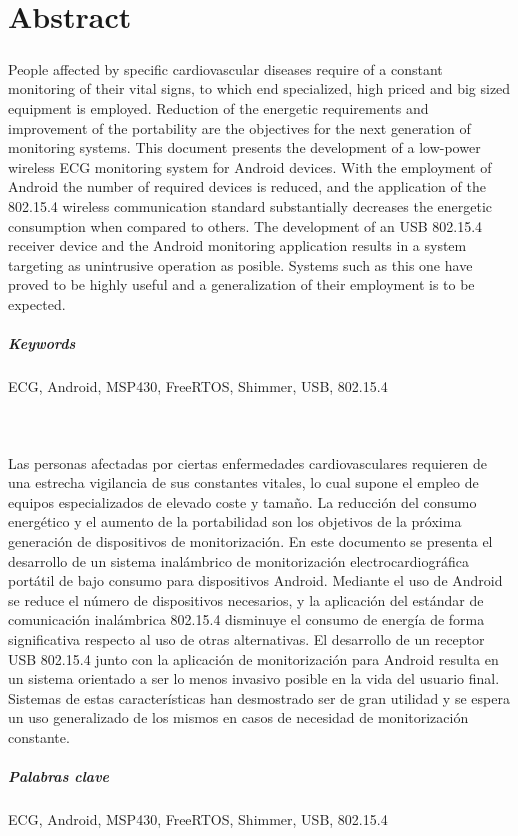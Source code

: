 \chapter{Abstract}
\label{cha:abstract}

	{\small 
	\paragraph{} People affected by specific cardiovascular diseases require of a constant monitoring of their vital signs, to which end specialized, high priced and big sized equipment is employed. Reduction of the energetic requirements and improvement of the portability are the objectives for the next generation of monitoring systems. This document presents the development of a low-power wireless ECG monitoring system for Android devices. With the employment of Android the number of required devices is reduced, and the application of the 802.15.4 wireless communication standard substantially decreases the energetic consumption when compared to others. The development of an USB 802.15.4 receiver device and the Android monitoring application results in a system targeting as unintrusive operation as posible. Systems such as this one have proved to be highly useful and a generalization of their employment is to be expected.
	\paragraph{Keywords}	
	ECG, Android, MSP430, FreeRTOS, Shimmer, USB, 802.15.4
	}\\
	
	{\small 
	\paragraph{} Las personas afectadas por ciertas enfermedades cardiovasculares requieren de una estrecha vigilancia de sus constantes vitales, lo cual supone el empleo de equipos especializados de elevado coste y tamaño. La reducción del consumo energético y el aumento de la portabilidad son los objetivos de la próxima generación de dispositivos de monitorización. En este documento se presenta el desarrollo de un sistema inalámbrico de monitorización electrocardiográfica portátil de bajo consumo para dispositivos Android. Mediante el uso de Android se reduce el número de dispositivos necesarios, y la aplicación del estándar de comunicación inalámbrica 802.15.4 disminuye el consumo de energía de forma significativa respecto al uso de otras alternativas. El desarrollo de un receptor USB 802.15.4 junto con la aplicación de monitorización para Android resulta en un sistema orientado a ser lo menos invasivo posible en la vida del usuario final. Sistemas de estas características han desmostrado ser de gran utilidad y se espera un uso generalizado de los mismos en casos de necesidad de monitorización constante.
	\paragraph{Palabras clave}
	ECG, Android, MSP430, FreeRTOS, Shimmer, USB, 802.15.4
	}



